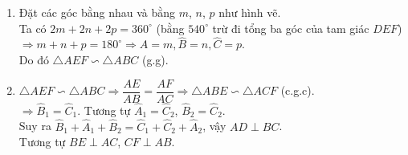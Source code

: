 \begin{bt}
{\begin{minipage}[h]{8cm}
  \end{minipage}
  \begin{enumerate}
  \item Đặt các góc bằng nhau và bằng $m$, $n$, $p$ như hình vẽ.\\
  Ta có $2m + 2n + 2p = 360^\circ$ (bằng $540^\circ$ trừ đi tổng ba góc của tam giác $DEF$)\\
  $\Rightarrow m + n + p = 180^\circ \Rightarrow \widehat{A} = m, \widehat{B} = n, \widehat{C} = p$.\\
  Do đó $\triangle AEF \backsim \triangle ABC$ (g.g).
  \item $\triangle AEF \backsim \triangle ABC \Rightarrow \dfrac{AE}{AB} = \dfrac{AF}{AC} \Rightarrow \triangle ABE \backsim \triangle ACF$ (c.g.c).\\
  $\Rightarrow \widehat{B}_1 = \widehat{C}_1$. Tương tự $\widehat{A}_1 = \widehat{C}_2$, $\widehat{B}_2 = \widehat{C}_2$.\\
  Suy ra $\widehat{B}_1 + \widehat{A}_1 + \widehat{B}_2 = \widehat{C}_1 + \widehat{C}_2 + \widehat{A}_2$, vậy $AD \perp BC$.\\
  Tương tự $BE \perp AC$, $CF \perp AB$.
  \end{enumerate}
  }
\end{bt}


